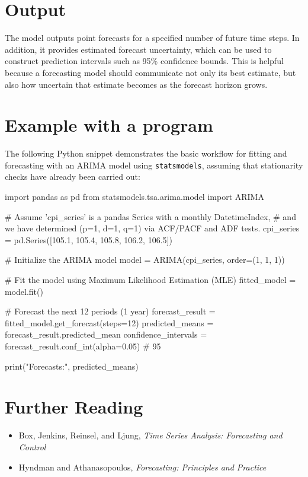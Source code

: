 \section{Output}
The model outputs point forecasts for a specified number of future time steps. In addition, it provides estimated forecast uncertainty, which can be used to construct prediction intervals such as 95\% confidence bounds. This is helpful because a forecasting model should communicate not only its best estimate, but also how uncertain that estimate becomes as the forecast horizon grows.

\section{Example with a program}
The following Python snippet demonstrates the basic workflow for fitting and forecasting with an ARIMA model using \texttt{statsmodels}, assuming that stationarity checks have already been carried out:

\begin{Python}[caption={ARIMA Implementation using Statsmodels}, label={lst:arima_python}]
import pandas as pd
from statsmodels.tsa.arima.model import ARIMA

# Assume 'cpi_series' is a pandas Series with a monthly DatetimeIndex,
# and we have determined (p=1, d=1, q=1) via ACF/PACF and ADF tests.
cpi_series = pd.Series([105.1, 105.4, 105.8, 106.2, 106.5])

# Initialize the ARIMA model
model = ARIMA(cpi_series, order=(1, 1, 1))

# Fit the model using Maximum Likelihood Estimation (MLE)
fitted_model = model.fit()

# Forecast the next 12 periods (1 year)
forecast_result = fitted_model.get_forecast(steps=12)
predicted_means = forecast_result.predicted_mean
confidence_intervals = forecast_result.conf_int(alpha=0.05) # 95%

print("Forecasts:\n", predicted_means)
\end{Python}

\section{Further Reading}
\begin{itemize}
    \item Box, Jenkins, Reinsel, and Ljung, \textit{Time Series Analysis: Forecasting and Control} \cite{Box2015}
    \item Hyndman and Athanasopoulos, \textit{Forecasting: Principles and Practice} \cite{Hyndman2021}
\end{itemize}
